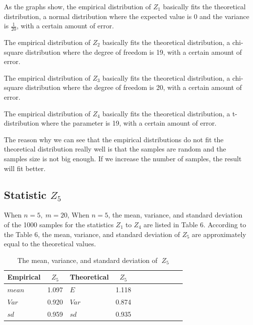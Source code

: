\documentclass[a4paper,11pt,fleqn]{article}
\begin{document}
\vskip 0.5cm

As the graphs show, the empirical distribution of $Z_1$ basically fits the theoretical distribution, a normal distribution where the expected value is 0 and the variance is $\frac{1}{20}$, with a certain amount of error.

The empirical distribution of $Z_2$ basically fits the theoretical distribution, a chi-square distribution where the degree of freedom is 19, with a certain amount of error.

The empirical distribution of $Z_3$ basically fits the theoretical distribution, a chi-square distribution where the degree of freedom is 20, with a certain amount of error.

The empirical distribution of $Z_4$ basically fits the theoretical distribution, a t-distribution where the parameter is 19, with a certain amount of error.

The reason why we can see that the empirical distributions do not fit the theoretical distribution really well is that the samples are random and the samples size is not big enough. If we increase the number of samples, the result will fit better.
\vskip 0.5cm
\vskip 0.5cm


\newpage
\subsection{Statistic $Z_5$ }
\vskip 0.5cm
When $n = 5, \;m = 20$, When $n = 5$,  the mean, variance, and standard deviation of the 1000 samples for the statistics $Z_1$ to $Z_4$ are listed in Table 6. According to the Table 6, the mean, variance, and standard deviation of $Z_5$ are approximately equal to  the theoretical values.

\vskip 0.5cm

\begin{table}[htbp]
\caption{The mean, variance, and standard deviation of $\;Z_5 $}
\vskip 0.5cm
\centering
 \begin{tabular}{lclclclclcl}
 \toprule
Empirical &$Z_5$  & Theoretical &$Z_5$\\
 \midrule
$mean$    & 1.097 &$E$       & 1.118 \\
$Var$     & 0.920 &$Var$     & 0.874\\
$sd $     & 0.959 &$sd $     & 0.935  \\

  \bottomrule
 \end{tabular}
\end{table}
\end{document}
